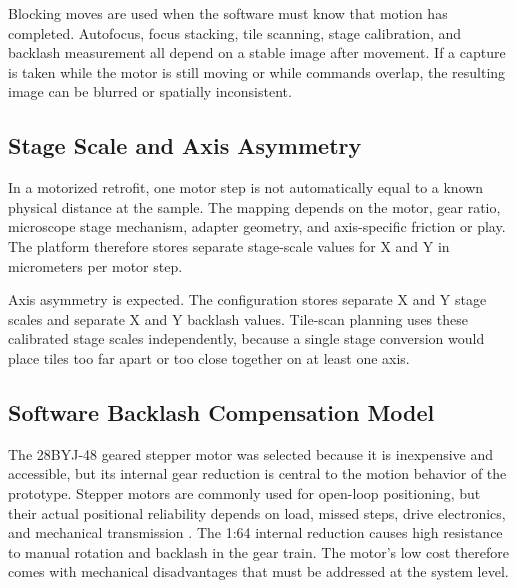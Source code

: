 Blocking moves are used when the software must know that motion has completed. Autofocus, focus stacking, tile scanning, stage calibration, and backlash measurement all depend on a stable image after movement. If a capture is taken while the motor is still moving or while commands overlap, the resulting image can be blurred or spatially inconsistent.

\subsection{Stage Scale and Axis Asymmetry}

In a motorized retrofit, one motor step is not automatically equal to a known physical distance at the sample. The mapping depends on the motor, gear ratio, microscope stage mechanism, adapter geometry, and axis-specific friction or play. The platform therefore stores separate stage-scale values for X and Y in micrometers per motor step.

Axis asymmetry is expected. The configuration stores separate X and Y stage scales and separate X and Y backlash values. Tile-scan planning uses these calibrated stage scales independently, because a single stage conversion would place tiles too far apart or too close together on at least one axis.

\subsection{Software Backlash Compensation Model}

The 28BYJ-48 geared stepper motor was selected because it is inexpensive and accessible, but its internal gear reduction is central to the motion behavior of the prototype. Stepper motors are commonly used for open-loop positioning, but their actual positional reliability depends on load, missed steps, drive electronics, and mechanical transmission \cite{acarnley2002stepping}. The 1:64 internal reduction causes high resistance to manual rotation and backlash in the gear train. The motor's low cost therefore comes with mechanical disadvantages that must be addressed at the system level.

